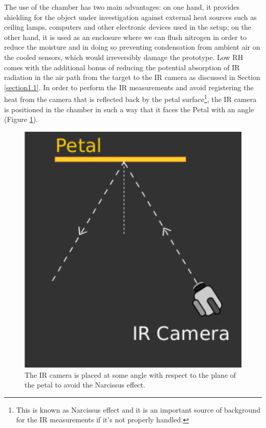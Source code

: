 		The use of the chamber has two main advantages: on one hand, it provides shielding for the object under investigation against external heat sources such as ceiling lamps, computers and other electronic devices used in the setup; on the other hand, it is used as an enclosure where we can flush nitrogen in order to reduce the moisture and in doing so preventing condensation from ambient air on the cooled sensors, which would irreversibly damage the prototype. Low RH comes with the additional bonus of reducing the potential absorption of IR radiation in the air path from the target to the IR camera as discussed in Section \ref{section1.1}.
		In order to perform the IR measurements and avoid registering the heat from the camera that is reflected back by the petal surface\footnote{{\footnotesize This is known as Narcissus effect and it is an important source of background for the IR measurements if it’s not properly handled.}}, the IR camera is positioned in the chamber in such a way that it faces the Petal with an angle (Figure \ref{fig2.4}).	
		
		\begin{figure}[ht!]
			\centering
			\captionsetup{justification=centering,margin=2cm}
			\includegraphics[scale=0.25]{Figures/Chapter02/NarcissusEffect.jpg}
			\caption{The IR camera is placed at some angle with respect to the plane of the petal to avoid the Narcissus effect.}\label{fig2.4}
		\end{figure}\bigskip
		
